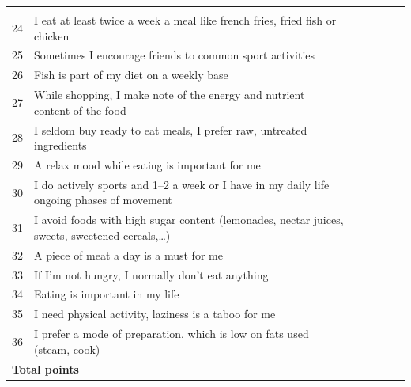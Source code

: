 \documentclass[../main.tex]{subfiles}
\begin{document}
\begin{longtable}{rp{8cm}|l|l|l|l|p{4mm}|}
\cellcolor{lightgray} \qedsymbol{} & \cellcolor{lightgray} \qedsymbol{} & \\  \cline{7-7}
24 & I eat at least twice a week a meal like french fries, fried fish or chicken &
\cellcolor{lightgray} \qedsymbol{} & \cellcolor{lightgray} \qedsymbol{} &
\cellcolor{lightgray} \qedsymbol{} & \cellcolor{lightgray} \qedsymbol{} & \\  \cline{7-7}
25 & Sometimes I encourage friends to common sport activities &
    \qedsymbol{} & \qedsymbol{} & \qedsymbol{} & \qedsymbol{} & \\  \cline{7-7}
26 & Fish is part of my diet on a weekly base &
    \qedsymbol{} & \qedsymbol{} & \qedsymbol{} & \qedsymbol{} & \\  \cline{7-7}
27 & While shopping, I make note of the energy and nutrient content of the food &
    \qedsymbol{} & \qedsymbol{} & \qedsymbol{} & \qedsymbol{} & \\  \cline{7-7}
28 & I seldom buy ready to eat meals, I prefer raw, untreated ingredients &
    \qedsymbol{} & \qedsymbol{} & \qedsymbol{} & \qedsymbol{} & \\  \cline{7-7}
 29 & A relax mood while eating is important for me &
    \qedsymbol{} & \qedsymbol{} & \qedsymbol{} & \qedsymbol{} & \\  \cline{7-7}
 30 & I do actively sports and 1--2 a week  or I have in my daily life ongoing phases of movement &
    \qedsymbol{} & \qedsymbol{} & \qedsymbol{} & \qedsymbol{} & \\  \cline{7-7}
    31 & I avoid foods with high sugar content (lemonades, nectar juices, sweets, sweetened cereals,\ldots) &
    \qedsymbol{} & \qedsymbol{} & \qedsymbol{} & \qedsymbol{} & \\  \cline{7-7}
    32 & A piece of meat a day is a must for me &
\cellcolor{lightgray} \qedsymbol{} & \cellcolor{lightgray} \qedsymbol{} &
\cellcolor{lightgray} \qedsymbol{} & \cellcolor{lightgray} \qedsymbol{} & \\  \cline{7-7}
        33 & If I'm not hungry, I normally don't eat anything &
    \qedsymbol{} & \qedsymbol{} & \qedsymbol{} & \qedsymbol{} & \\  \cline{7-7}
    34 & Eating is important in my life &
    \qedsymbol{} & \qedsymbol{} & \qedsymbol{} & \qedsymbol{} & \\  \cline{7-7}
        35 & I need physical activity, laziness is a taboo for me &
    \qedsymbol{} & \qedsymbol{} & \qedsymbol{} & \qedsymbol{} & \\  \cline{7-7}
        36 & I prefer a mode of preparation, which is low on fats used (steam, cook) &
    \qedsymbol{} & \qedsymbol{} & \qedsymbol{} & \qedsymbol{} & \\  \cline{7-7}
    \bottomrule
    \multicolumn{2}{l}{\textbf{Total points}} \\
\end{longtable}
\end{document}

